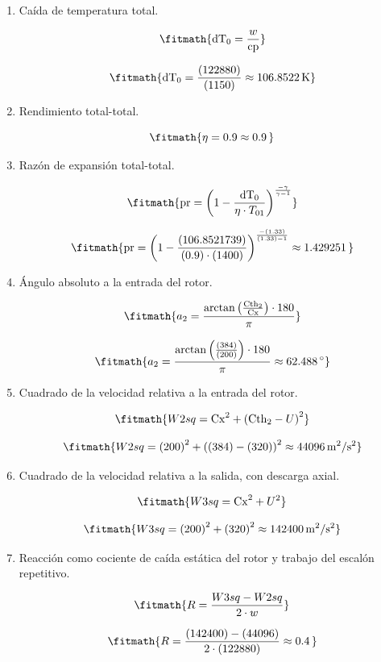 \begin{enumerate}
\[\fitmath{\varphi=\frac{\mathrm{Cx}}{U}}\]

\[\fitmath{\varphi=\frac{(200)}{(320)}\approx 0.625\,}\]

\item Caída de temperatura total.

\[\fitmath{\mathrm{dT}_{0}=\frac{w}{\mathrm{cp}}}\]

\[\fitmath{\mathrm{dT}_{0}=\frac{(122880)}{(1150)}\approx 106.8522\,\mathrm{K}}\]

\item Rendimiento total-total.

\[\fitmath{\eta=0.9\approx 0.9\,}\]

\item Razón de expansión total-total.

\[\fitmath{\mathrm{pr}={\left(1-\frac{\mathrm{dT}_{0}}{\eta\cdot T_{01}}\right)}^{\frac{-\gamma}{\gamma-1}}}\]

\[\fitmath{\mathrm{pr}={\left(1-\frac{(106.8521739)}{(0.9)\cdot (1400)}\right)}^{\frac{-(1.33)}{(1.33)-1}}\approx 1.429251\,}\]

\item Ángulo absoluto a la entrada del rotor.

\[\fitmath{a_{2}=\frac{\arctan\left(\frac{\mathrm{Cth}_{2}}{\mathrm{Cx}}\right)\cdot 180}{\pi}}\]

\[\fitmath{a_{2}=\frac{\arctan\left(\frac{(384)}{(200)}\right)\cdot 180}{\pi}\approx 62.488\,{}^{\circ}}\]

\item Cuadrado de la velocidad relativa a la entrada del rotor.

\[\fitmath{W2sq={\mathrm{Cx}}^{2}+{\left(\mathrm{Cth}_{2}-U\right)}^{2}}\]

\[\fitmath{W2sq={(200)}^{2}+{\left((384)-(320)\right)}^{2}\approx 44096\,\mathrm{m^{2}/s^{2}}}\]

\item Cuadrado de la velocidad relativa a la salida, con descarga axial.

\[\fitmath{W3sq={\mathrm{Cx}}^{2}+{U}^{2}}\]

\[\fitmath{W3sq={(200)}^{2}+{(320)}^{2}\approx 142400\,\mathrm{m^{2}/s^{2}}}\]

\item Reacción como cociente de caída estática del rotor y trabajo del escalón repetitivo.

\[\fitmath{R=\frac{W3sq-W2sq}{2\cdot w}}\]

\[\fitmath{R=\frac{(142400)-(44096)}{2\cdot (122880)}\approx 0.4\,}\]


\end{enumerate}
